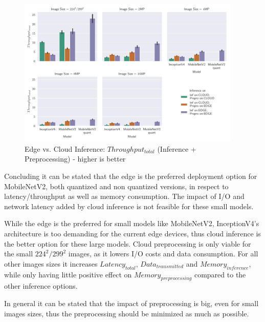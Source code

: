 \begin{figure}[!htb]
\centering
\includegraphics[width=0.95\textwidth]{./Bilder/single_plots/edge_vs_cloud_plots/Edge_vs_Cloud_Inference_Throughput_with_Preprocessing.pdf}
\caption{Edge vs. Cloud Inference:  $Throughput_{total}$ (Inference + Preprocessing) - higher is better}
\label{fig:EdgeVsCloudTotalThroughput}
\end{figure}




Concluding it can be stated that the edge is the preferred deployment option for MobileNetV2, both quantized and non quantized versions, in respect to latency/throughput as well as memory consumption.
The impact of I/O and network latency added by cloud inference is not feasible for these small models.

While the edge is the preferred for small models like MobileNetV2, InceptionV4's architecture is too demanding for the current edge devices, thus cloud inference is the better option for these large models.
Cloud preprocessing is only viable for the small $224^2/299^2$ images, as it lowers I/O costs and data consumption. For all other images sizes it increases $Latency_{total}$, $Data_{transmitted}$ and $Memory_{inference}$, while only having little positive effect on $Memory_{preprocessing}$ compared to the other inference options.

In general it can be stated that the impact of preprocessing is big, even for small images sizes, thus the preprocessing should be minimized as much as possible.

\FloatBarrier
